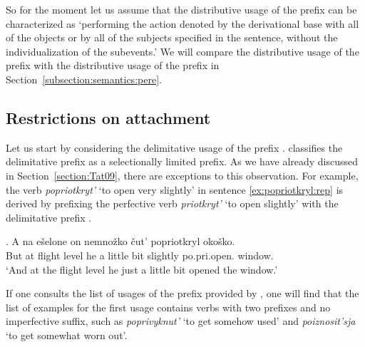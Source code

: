 So for the moment let us assume that the distributive usage of the prefix  can be characterized as `performing the action denoted by the derivational base with all of the objects or by all of the subjects specified in the sentence, without the individualization of the subevents.' We will compare the distributive usage of the prefix  with the distributive usage of the prefix  in Section~\ref{subsection:semantics:pere}.

\subsection{Restrictions on attachment} 
Let us start by considering the delimitative usage of the prefix . \citet{Tatevosov:09} classifies the delimitative prefix  as a selectionally limited prefix. As we have already discussed in Section~\ref{section:Tat09}, there are exceptions to this observation. For example, the verb \textit{popriotkryt'} `to open very slightly' in sentence \ref{ex:popriotkryl:rep} is derived by prefixing the perfective verb \textit{priotkryt'} `to open slightly' with the delimitative prefix .

\exg. \label{ex:popriotkryl:rep}A na e\v{s}elone on nemno\v{z}ko \v{c}ut' popriotkryl oko\v{s}ko.\\
But at {flight level} he {a little bit} {slightly} po.pri.open. window.\\
\trans `And at the flight level he just a little bit opened the window.'\\

If one consults the list of usages of the prefix  provided by \citet{Shvedova:82}, one will find that the list of examples for the first usage contains verbs with two prefixes and no imperfective suffix, such as \textit{poprivyknut'} `to get somehow used' and \textit{poiznosit'sja} `to get somewhat worn out'. 



